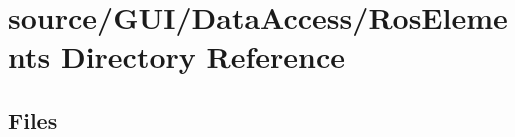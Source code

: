 \section{source/\+G\+U\+I/\+Data\+Access/\+Ros\+Elements Directory Reference}
\label{dir_0ca3af4afe0f46c6b973d0240d6b9baf}
\subsection*{Files}
\begin{DoxyCompactItemize}
\end{DoxyCompactItemize}
